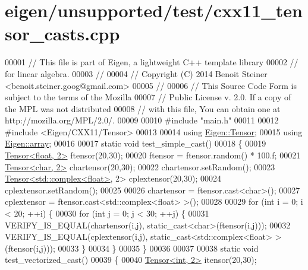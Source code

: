 \hypertarget{eigen_2unsupported_2test_2cxx11__tensor__casts_8cpp_source}{}\section{eigen/unsupported/test/cxx11\+\_\+tensor\+\_\+casts.cpp}
\label{eigen_2unsupported_2test_2cxx11__tensor__casts_8cpp_source}

\begin{DoxyCode}
00001 \textcolor{comment}{// This file is part of Eigen, a lightweight C++ template library}
00002 \textcolor{comment}{// for linear algebra.}
00003 \textcolor{comment}{//}
00004 \textcolor{comment}{// Copyright (C) 2014 Benoit Steiner <benoit.steiner.goog@gmail.com>}
00005 \textcolor{comment}{//}
00006 \textcolor{comment}{// This Source Code Form is subject to the terms of the Mozilla}
00007 \textcolor{comment}{// Public License v. 2.0. If a copy of the MPL was not distributed}
00008 \textcolor{comment}{// with this file, You can obtain one at http://mozilla.org/MPL/2.0/.}
00009 
00010 \textcolor{preprocessor}{#include "main.h"}
00011 
00012 \textcolor{preprocessor}{#include <Eigen/CXX11/Tensor>}
00013 
00014 \textcolor{keyword}{using} \hyperlink{class_eigen_1_1_tensor}{Eigen::Tensor};
00015 \textcolor{keyword}{using} \hyperlink{class_eigen_1_1array}{Eigen::array};
00016 
00017 \textcolor{keyword}{static} \textcolor{keywordtype}{void} test\_simple\_cast()
00018 \{
00019   \hyperlink{class_eigen_1_1_tensor}{Tensor<float, 2>} ftensor(20,30);
00020   ftensor = ftensor.random() * 100.f;
00021   \hyperlink{class_eigen_1_1_tensor}{Tensor<char, 2>} chartensor(20,30);
00022   chartensor.setRandom();
00023   \hyperlink{class_eigen_1_1_tensor}{Tensor<std::complex<float>}, 2> cplextensor(20,30);
00024   cplextensor.setRandom();
00025 
00026   chartensor = ftensor.cast<\textcolor{keywordtype}{char}>();
00027   cplextensor = ftensor.cast<std::complex<float> >();
00028 
00029   \textcolor{keywordflow}{for} (\textcolor{keywordtype}{int} i = 0; i < 20; ++i) \{
00030     \textcolor{keywordflow}{for} (\textcolor{keywordtype}{int} j = 0; j < 30; ++j) \{
00031       VERIFY\_IS\_EQUAL(chartensor(i,j), static\_cast<char>(ftensor(i,j)));
00032       VERIFY\_IS\_EQUAL(cplextensor(i,j), \textcolor{keyword}{static\_cast<}std::complex<float> \textcolor{keyword}{>}(ftensor(i,j)));
00033     \}
00034   \}
00035 \}
00036 
00037 
00038 \textcolor{keyword}{static} \textcolor{keywordtype}{void} test\_vectorized\_cast()
00039 \{
00040   \hyperlink{class_eigen_1_1_tensor}{Tensor<int, 2>} itensor(20,30);

\end{DoxyCode}

